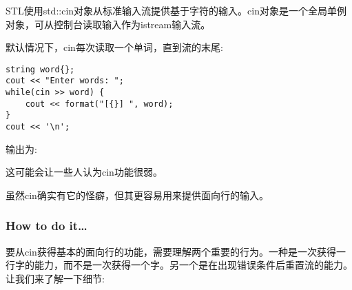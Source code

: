 
STL使用std::cin对象从标准输入流提供基于字符的输入。cin对象是一个全局单例对象，可从控制台读取输入作为istream输入流。

默认情况下，cin每次读取一个单词，直到流的末尾:

\begin{lstlisting}[style=styleCXX]
string word{};
cout << "Enter words: ";
while(cin >> word) {
	cout << format("[{}] ", word);
}
cout << '\n';
\end{lstlisting}

输出为:


这可能会让一些人认为cin功能很弱。

虽然cin确实有它的怪癖，但其更容易用来提供面向行的输入。

\subsubsection{How to do it…}

要从cin获得基本的面向行的功能，需要理解两个重要的行为。一种是一次获得一行字的能力，而不是一次获得一个字。另一个是在出现错误条件后重置流的能力。让我们来了解一下细节:

